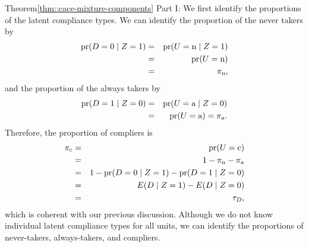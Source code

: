  
\begin{myproof}{Theorem}{\ref{thm::cace-mixture-components}}
Part I: We first identify the proportions of the latent compliance types.
We can identify the proportion of the never takers by
\begin{eqnarray*}
\textup{pr}(D=0\mid Z=1) 
&=& \textup{pr}(U=\textup{n} \mid Z=1)  \\
&=& \textup{pr}(U=\textup{n}) \\
&=&  \pi_{\textup{n}} ,
\end{eqnarray*}
and the proportion of the always takers by
\begin{eqnarray*}
\textup{pr}(D=1\mid Z=0) 
&=& \textup{pr}(U=\textup{a} \mid Z=0)  \\
&=& \textup{pr}(U=\textup{a}) =  \pi_{\textup{a}} . 
\end{eqnarray*}
Therefore, the proportion of compliers is
\begin{eqnarray*}
\pi_{\textup{c}} &=& \textup{pr}(U=\textup{c}) \\
&=& 1-  \pi_{\textup{n}} -  \pi_{\textup{a}}  \\
&=& 1 - \textup{pr}(D=0\mid Z=1)  - \textup{pr}(D=1\mid Z=0) \\
&=& E(D\mid Z=1) - E(D\mid Z=0) \\
&=& \tau_D,
\end{eqnarray*}
which is coherent with our previous discussion. Although we do not know individual latent compliance types for all units, we can identify the proportions of never-takers, always-takers, and compliers. 



\end{myproof}
